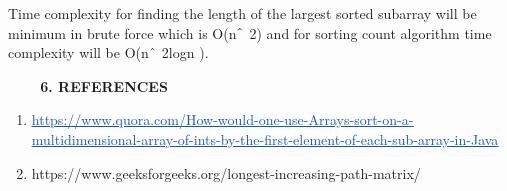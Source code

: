 \documentclass[12pt]{report}
\renewcommand{\_}{\kern-1.5pt\textunderscore\kern-1.5pt}
\begin{document}
\begin{multicols}{2}
\begin{FlushLeft}
Time complexity for finding the length of the largest sorted subarray will be minimum in brute force which is O(n$ \string^ $ 2) and for sorting count algorithm time complexity will be O(n$ \string^ $ 2logn ).
\end{FlushLeft}\par


\vspace{\baselineskip}

\vspace{\baselineskip}
\begin{Center}
\textbf{\ \ \ \  6. REFERENCES}
\end{Center}\par

\begin{enumerate}
	\item \href{https://www.quora.com/How-would-one-use-Arrays-sort-on-a-multidimensional-array-of-ints-by-the-first-element-of-each-sub-array-in-Java}{\textcolor[HTML]{1155CC}{\ul{https://www.quora.com/How-would-one-use-Arrays-sort-on-a-multidimensional-array-of-ints-by-the-first-element-of-each-sub-array-in-Java}}}\par

	\item https://www.geeksforgeeks.org/longest-increasing-path-matrix/
\end{enumerate}\par


\vspace{\baselineskip}

\vspace{\baselineskip}
\tab 
\vspace{\baselineskip}
\vspace{\baselineskip}

\vspace{\baselineskip}

\vspace{\baselineskip}

\vspace{\baselineskip}

\vspace{\baselineskip}

\vspace{\baselineskip}

\vspace{\baselineskip}

\vspace{\baselineskip}

\vspace{\baselineskip}

\vspace{\baselineskip}

\end{multicols}

\printbibliography
\end{document}
